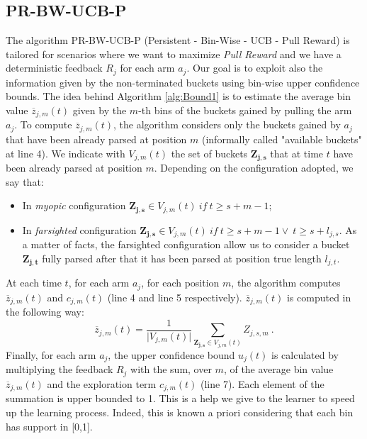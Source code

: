 \subsection{PR-BW-UCB-P}
The algorithm PR-BW-UCB-P (Persistent - Bin-Wise - UCB - Pull Reward)  is tailored for scenarios where we want to maximize \emph{Pull Reward} and we have a deterministic feedback $R_j$ for each arm $a_j$. Our goal is to exploit also the information given by the non-terminated buckets using bin-wise upper confidence bounds. The idea behind Algorithm \ref{alg:Bound1} is to estimate the average bin value $\overline{z}_{j,m}(t)$ given by the $m$-th bins of the buckets gained by pulling the arm $a_j$. To compute $\overline{z}_{j,m}(t)$, the algorithm considers only the buckets gained by $a_j$ that have been already parsed at position $m$ (informally called "available buckets" at line 4). We indicate with $V_{j,m}(t)$ the set of buckets $\boldsymbol{Z_{j,s}}$ that at time $t$ have been already parsed at position $m$. Depending on the configuration adopted, we say that:
\begin{itemize}
	\item In \emph{myopic} configuration  $\boldsymbol{Z_{j,s}} \in V_{j,m}(t) \ if \ t\geq s+m-1$;
	\item In \emph{farsighted} configuration  $\boldsymbol{Z_{j,s}} \in V_{j,m}(t) \ if \ t\geq s+m-1 \vee \ t \geq s+l_{j,s} $. As a matter of facts, the farsighted configuration allow us to consider a bucket $\boldsymbol{Z_{j,t}}$ fully parsed after that it has been parsed at position true length $l_{j,t}$. 
\end{itemize}


At each time $t$, for each arm $a_j$, for each position $m$, the algorithm computes $\overline{z}_{j,m}(t)$ and $c_{j,m}(t)$ (line 4 and line 5 respectively). $\overline{z}_{j,m}(t)$ is computed in the following way: $$\overline{z}_{j,m}(t) = \frac{1}{\vert V_{j,m}(t) \vert} \sum_{\boldsymbol{Z_{j,s}} \in V_{j,m}(t)} Z_{j,s,m}\ .$$
Finally, for each arm $a_j$, the upper confidence bound $u_j(t)$ is calculated by multiplying the feedback $R_j$  with the sum, over $m$, of the average bin value $\overline{z}_{j,m}(t)$ and the exploration term  $c_{j,m}(t)$  (line 7). Each element of the summation is upper bounded to 1. This is a help we give to the learner to speed up the learning process. Indeed, this is known a priori considering that each bin has support in [0,1]. 









